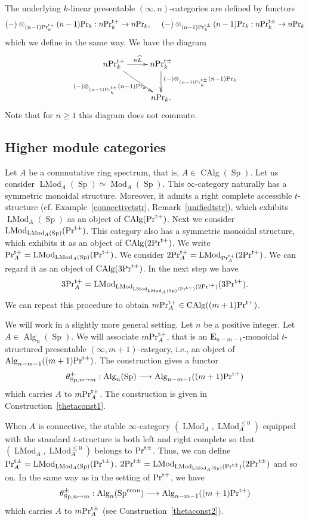 \documentclass[leqno,12pt]{amsart}
\theoremstyle{plain}
\theoremstyle{definition}
\newcommand{\PR}{\textup{Pr}}
\newcommand{\PRTT}{\textup{Pr}^{\textup{t}+}}
\newcommand{\PRTTT}{\textup{Pr}^{\textup{t}\pm}}
\newcommand{\SP}{\operatorname{Sp}}
\newcommand{\SPC}{\operatorname{Sp}^{\textup{conn}}}
\newcommand{\Mod}{\operatorname{Mod}}
\newcommand{\Alg}{\operatorname{Alg}}
\newcommand{\CAlg}{\operatorname{CAlg}}
\newcommand{\LMod}{\operatorname{LMod}}
\begin{document}
The underlying $k$-linear presentable $(\infty,n)$-categories are defined by functors
\[
(-)\otimes_{(n-1)\PRTT_k}(n-1)\PR_k :n\PRTT_k\to n\PR_k,\ \ \ \ (-)\otimes_{(n-1)\PRTTT_k}(n-1)\PR_k :n\PRTTT_k\to n\PR_k
\]
which we define in the same way.
We have the diagram
\[
\xymatrix{
n\PRTT_k \ar[r]^{n\widehat{L}} \ar[rd]_{(-)\otimes_{(n-1)\PRTT_k}(n-1)\PR_k} & n\PRTTT_k  \ar[d]^{(-)\otimes_{(n-1)\PRTTT_k}(n-1)\PR_k} \\
     &   n\PR_k.
}
\]
Note that for $n\ge1$ this diagram does not commute.





\subsection{Higher module categories}

\label{thetasection}




Let $A$ be a commutative ring spectrum, that is, $A\in \CAlg(\SP)$.
Let us consider $\LMod_A(\SP)\simeq \Mod_A(\SP)$. This $\infty$-category naturally has a symmetric monoidal structure.
Moreover, it admits a right complete accessible $t$-structure (cf. Example~\ref{connectivetstr}, Remark~\ref{unifiedtstr}), which exhibits $\LMod_A(\SP)$ as an object of $\CAlg(\PRTT)$.
Next we consider $\LMod_{\LMod_A(\SP)}(\PRTT)$. This category also has a symmetric monoidal structure, which exhibits it as an object of 
$\CAlg(2\PRTT)$. We write $\PRTT_A=\LMod_{\LMod_A(\SP)}(\PRTT)$.
We consider $2\PRTT_A=\LMod_{\PRTT_A}(2\PRTT)$. We can regard it as an object of $\CAlg(3\PRTT)$.
In the next step we have
\[
3\PRTT_A=\LMod_{\LMod_{\LMod_{\LMod_A(\SP)}(\PRTT)}(2\PRTT)}(3\PRTT).
\]
We can repeat this procedure to obtain $m\PRTT_A\in \CAlg((m+1)\PRTT)$.


We will work in a slightly more general setting. 
Let $n$ be a positive integer.
Let $A\in \Alg_{n}(\SP)$.
We will associate $m\PRTT_A$, that is an $\mathbf{E}_{n-m-1}$-monoidal $t$-structured presentable $(\infty,m+1)$-category, i.e., an object of $\Alg_{n-m-1}((m+1)\PRTT)$.
The construction gives a functor
\[
\theta_{\SP,n\mapsto m}^+:\Alg_{n}(\SP)\longrightarrow \Alg_{n-m-1}((m+1)\PRTT)
\]
which carries $A$ to $m\PRTT_A$. The construction is given in Construction~\ref{thetaconst1}.

When $A$ is connective, the stable $\infty$-category $(\LMod_A, \LMod_A^{\le0})$ equipped with the standard $t$-structure is 
 both left and right complete so that $(\LMod_A, \LMod_A^{\le0})$ belongs to $\PRTTT$.
Thus, we can define $\PRTTT_A=\LMod_{\LMod_A(\SP)}(\PRTTT)$, $2\PRTTT=\LMod_{\LMod_{\LMod_A(\SP)}(\PRTTT)}(2\PRTTT)$ and so on.
In the same way as in the setting of $\PRTT$, we have
\[
\theta^{\pm}_{\SP,n\mapsto m}:\Alg_{n}(\SPC)\longrightarrow \Alg_{n-m-1}((m+1)\PRTT)
\]
which carries $A$ to $m\PRTTT_A$ (see Construction~\ref{thetaconst2}).
\end{document}

